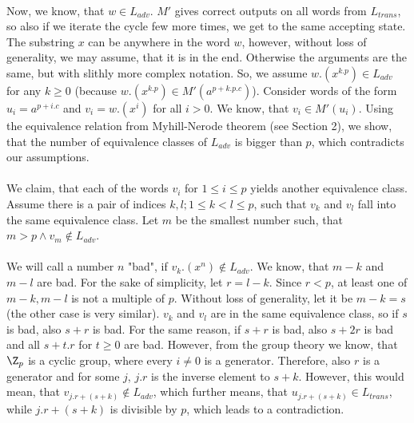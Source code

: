 \paragraph{}
Now, we know, that $w \in L_{adv}$. $M'$ gives correct outputs on all words from $L_{trans}$, so also if we iterate the cycle few more times, we get to the same accepting state.  The substring $x$ can be anywhere in the word $w$, however, without loss of generality, we may assume, that it is in the end. Otherwise the arguments are the same, but with slithly more complex notation. So, we assume $w.(x^{k.p}) \in L_{adv}$ for any $k \geq 0$ (because $w.(x^{k.p}) \in M'(a^{p+k.p.c})$). Consider words of the form $u_i = a^{p+i.c}$ and $v_i = w.(x^i)$ for all $i > 0$. We know, that $v_i \in M'(u_i)$. Using the equivalence relation from Myhill-Nerode theorem (see Section 2), we show, that the number of equivalence classes of $L_{adv}$ is bigger than $p$, which contradicts our assumptions.

\paragraph{}
We claim, that each of the words $v_i$ for $1 \leq i \leq p$ yields another equivalence class. Assume there is a pair of indices $k,l; 1 \leq k < l \leq p$, such that $v_k$ and $v_l$ fall into the same equivalence class. Let $m$ be the smallest number such, that $m>p \wedge v_m \notin L_{adv}$.

\paragraph{}
We will call a number $n$ "bad", if $v_k.(x^{n}) \notin L_{adv}$. We know, that $m-k$ and $m-l$ are bad. For the sake of simplicity, let $r = l-k$. Since $r < p$, at least one of $m-k, m-l$ is not a multiple of $p$. Without loss of generality, let it be $m-k = s$ (the other case is very similar). $v_k$ and $v_l$ are in the same equivalence class, so if $s$ is bad, also $s+r$ is bad. For the same reason, if $s+r$ is bad, also $s+2r$ is bad and all $s+t.r$ for $t \geq 0$ are bad. However, from the group theory we know, that $\Z_p$ is a cyclic group, where every $i \neq 0$ is a generator. Therefore, also $r$ is a generator and for some $j$, $j.r$ is the inverse element to $s+k$. However, this would mean, that $v_{j.r+(s+k)} \notin L_{adv}$, which further means, that $u_{j.r+(s+k)} \in L_{trans}$, while $j.r+(s+k)$ is divisible by $p$, which leads to a contradiction.

